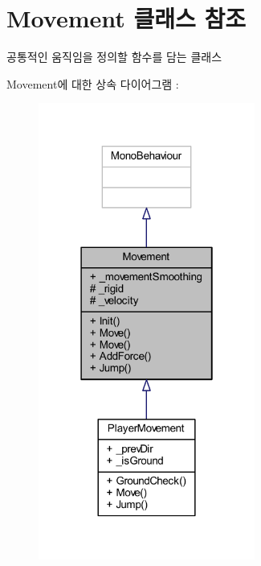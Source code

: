 \hypertarget{class_movement}{}\section{Movement 클래스 참조}
\label{class_movement}


공통적인 움직임을 정의할 함수를 담는 클래스  




Movement에 대한 상속 다이어그램 \+: \nopagebreak
\begin{figure}[H]
\begin{center}
\leavevmode
\includegraphics[width=202pt]{d8/d54/class_movement__inherit__graph}
\end{center}
\end{figure}


